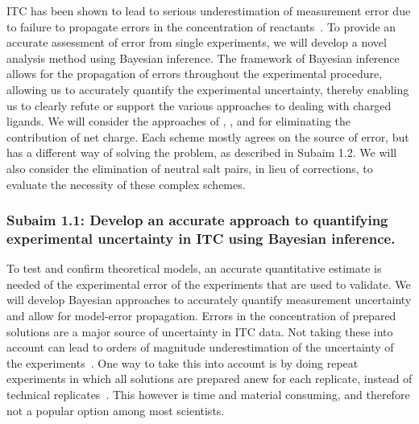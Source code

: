 \documentclass[10pt,final]{article}
\begin{document}
ITC has been shown to lead to serious underestimation of measurement error due to failure to propagate errors in the concentration of reactants~\autocite{Myszka2003a,Tellinghuisen2011a}.
%
To provide an accurate assessment of error from single experiments, we will develop a novel analysis method using Bayesian inference.
%
The framework of Bayesian inference allows for the propagation of errors throughout the experimental procedure, allowing us to accurately quantify the experimental uncertainty, thereby enabling us to clearly refute or support the various approaches to dealing with charged ligands.
%
We will consider the approaches of \textcite{Reif2013a}, \textcite{Rocklin2013a}, and \textcite{Lin2014a} for eliminating the contribution of net charge.  Each scheme mostly agrees on the source of error, but has a different way of solving the problem, as described in Subaim 1.2. 
%
We will also consider the elimination of neutral salt pairs, in lieu of corrections, to evaluate the necessity of these complex schemes.


\subsubsection*{Subaim 1.1: Develop an accurate approach to quantifying experimental uncertainty in ITC using Bayesian inference.}
To test and confirm theoretical models, an accurate quantitative estimate is needed of the experimental error of the experiments that are used to validate.
%
We will develop Bayesian approaches to accurately quantify measurement uncertainty and allow for model-error propagation. 
Errors in the concentration of prepared solutions are a major source of uncertainty in ITC data. Not taking these into account can lead to orders of magnitude underestimation of the uncertainty of the experiments~\autocite{Myszka2003a,Tellinghuisen2011a}.
One way to take this into account is by doing repeat experiments in which all solutions are prepared anew for each replicate, instead of technical replicates~\autocite{Vaux2012a}. This however is time and material consuming, and therefore not a popular option among most scientists. 
\end{document}
